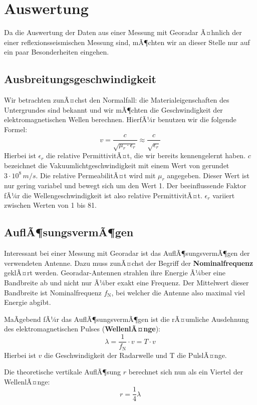 \section{Auswertung}
Da die Auswertung der Daten aus einer Messung mit Georadar Ã¤hnlich der einer reflexionsseismischen Messung sind, mÃ¶chten wir an dieser Stelle nur auf ein paar Besonderheiten eingehen. 

\subsection{Ausbreitungsgeschwindigkeit}
Wir betrachten zunÃ¤chst den Normalfall: die Materialeigenschaften des Untergrundes sind bekannt und wir mÃ¶chten die Geschwindigkeit der elektromagnetischen Wellen berechnen. HierfÃ¼r benutzen wir die folgende Formel: \begin{equation*}
	v = \frac{c}{\sqrt{\mu_r \cdot \epsilon_r}} \approx \frac{c}{\sqrt{\epsilon_r}}
\end{equation*}
Hierbei ist $\epsilon_r$ die relative PermittivitÃ¤t, die wir bereits kennengelernt haben. $c$ bezeichnet die Vakuumlichtgeschwindigkeit mit einem Wert von gerundet $3 \cdot 10^{8}\,\si{m/s}$. Die relative PermeabilitÃ¤t wird mit $\mu_r$ angegeben. Dieser Wert ist nur gering variabel und bewegt sich um den Wert 1. Der beeinflussende Faktor fÃ¼r die Wellengeschwindigkeit ist also relative PermittivitÃ¤t. $\epsilon_r$ variiert zwischen Werten von 1 bis 81.

\subsection{AuflÃ¶sungsvermÃ¶gen}
Interessant bei einer Messung mit Georadar ist das AuflÃ¶sungsvermÃ¶gen der verwendeten Antenne. Dazu muss zunÃ¤chst der Begriff der \textbf{Nominalfrequenz} geklÃ¤rt werden. Georadar-Antennen strahlen ihre Energie Ã¼ber eine Bandbreite ab und nicht nur Ã¼ber exakt eine Frequenz. Der Mittelwert dieser Bandbreite ist Nominalfrequenz $f_{\text{N}}$, bei welcher die Antenne also maximal viel Energie abgibt.

MaÃgebend fÃ¼r das AuflÃ¶sungsvermÃ¶gen ist die rÃ¤umliche Ausdehnung des elektromagnetischen Pulses (\textbf{WellenlÃ¤nge}): \begin{equation*}
	\lambda = \frac{1}{f_{\text{N}}} \cdot v = T \cdot v
\end{equation*} Hierbei ist $v$ die Geschwindigkeit der Radarwelle und T die PulslÃ¤nge.

Die theoretische vertikale AuflÃ¶sung $r$ berechnet sich nun als ein Viertel der WellenlÃ¤nge: \begin{equation*}
	r = \frac{1}{4} \lambda
\end{equation*}


